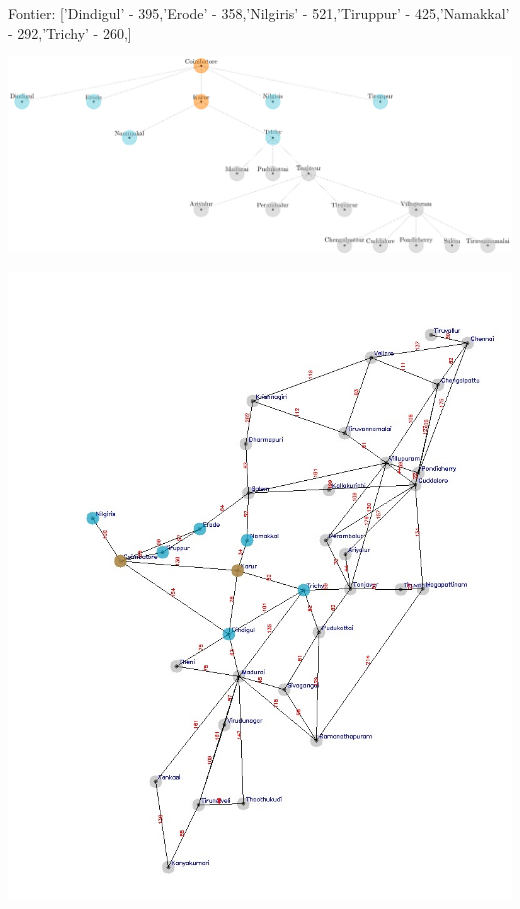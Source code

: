 \documentclass[xcolor=table]{beamer}
\begin{document}
\begin{frame}
  { \tiny Fontier: ['Dindigul' - 395,'Erode' - 358,'Nilgiris' - 521,'Tiruppur' - 425,'Namakkal' - 292,'Trichy' - 260,] }
  \begin{center}
  \includegraphics[height=0.35\textheight]{../GreedyNode/4-1.png}
  \end{center}
  \begin{center}
    \includegraphics[height=0.55\textheight]{../Greedyoutput/tamilGreedy2.jpg}
  \end{center}
\end{frame}
\end{document}
